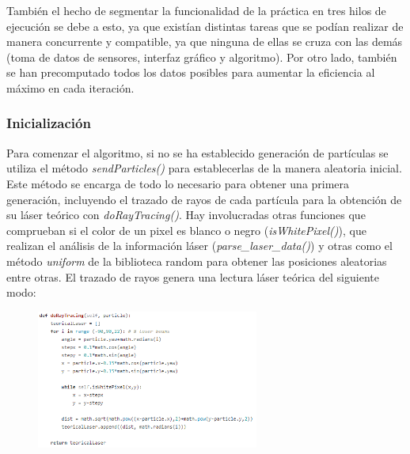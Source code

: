 También el hecho de segmentar la funcionalidad de la práctica en tres hilos de ejecución se debe a esto, ya que existían distintas tareas que se podían realizar de manera concurrente y compatible, ya que ninguna de ellas se cruza con las demás (toma de datos de sensores, interfaz gráfico y algoritmo).
Por otro lado, también se han precomputado todos los datos posibles para aumentar la eficiencia al máximo en cada iteración.

\subsubsection{Inicialización}
Para comenzar el algoritmo, si no se ha establecido generación de partículas se utiliza el método \textit{sendParticles()} para establecerlas de la manera aleatoria inicial. Este método se encarga de todo lo necesario para obtener una primera generación, incluyendo el trazado de rayos de cada partícula para la obtención de su láser teórico con \textit{doRayTracing()}. Hay involucradas otras funciones que comprueban si el color de un pixel es blanco o negro (\textit{isWhitePixel()}), que realizan el análisis de la información láser (\textit{parse\_laser\_data()}) y otras como el método \textit{uniform} de la biblioteca random para obtener las posiciones aleatorias entre otras. El trazado de rayos genera una lectura láser teórica del siguiente modo:

\begin{figure}[H]
\begin{center}
	\includegraphics[width=0.65\textwidth]{figures/doraytracing.png}
	\label{fig.doraytracing}
	\end{center}
\end{figure}

